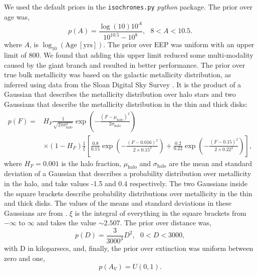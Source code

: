 \documentclass[useAMS, usenatbib, preprint, 12pt]{aastex}
\begin{document}
We used the default priors in the {\tt isochrones.py} {\it python} package.
The prior over age was,
\begin{equation}
p(A) = \frac{\log(10) 10^{A}}{10^{10.5} - 10^8}, ~~~ 8 < A < 10.5.
\end{equation}
where $A$, is $\log_{10}(\mathrm{Age~[yrs]})$.
The prior over EEP was uniform with an upper limit of 800.
We found that adding this upper limit reduced some multi-modality caused by
the giant branch and resulted in better performance.
The prior over true bulk metallicity was based on the galactic metallicity
distribution, as inferred using data from the Sloan Digital Sky Survey
\citep{casagrande2011}.
It is the product of a Gaussian that describes the metallicity distribution
over halo stars and two Gaussians that describe the metallicity distribution
in the thin and thick disks:
\begin{eqnarray}
    p(F) =
    & H_F \frac{1}{\sqrt{2\pi\sigma_{\mathrm{halo}}^2}}
    \exp\left(-\frac{(F-\mu_{\mathrm{halo}})^2}{2\sigma_{\mathrm{halo}}}\right)
    \\ \nonumber
    & \times (1-H_F)
    \frac{1}{\xi}
    \left[\frac{0.8}{0.15}\exp\left(-\frac{(F-0.016)^2}{2\times 0.15^2}\right)
    + \frac{0.2}{0.22}\exp\left(-\frac{(F-0.15)^2}{2\times
    0.22^2}\right)\right],
\end{eqnarray}
where $H_F = 0.001$ is the halo fraction, $\mu_\mathrm{halo}$ and
$\sigma_{\mathrm{halo}}$ are the mean and standard deviation of a Gaussian
that describes a probability distribution over metallicity in the halo, and
take values -1.5 and 0.4 respectively.
The two Gaussians inside the square brackets describe probability
distributions over metallicity in the thin and thick disks.
The values of the means and standard deviations in these Gaussians are from
\citet{casagrande2011}.
$\xi$ is the integral of everything in the square brackets from $-\infty$ to
$\infty$ and takes the value $\sim 2.507$.
The prior over distance was,
\begin{equation}
    p(D) = \frac{3}{3000^3} D^2, ~~~ 0 < D < 3000,
\end{equation}
with D in kiloparsecs, and, finally, the prior over extinction was uniform
between zero and one,
\begin{equation}
    p(A_V) = U(0, 1).
\end{equation}



\end{document}
